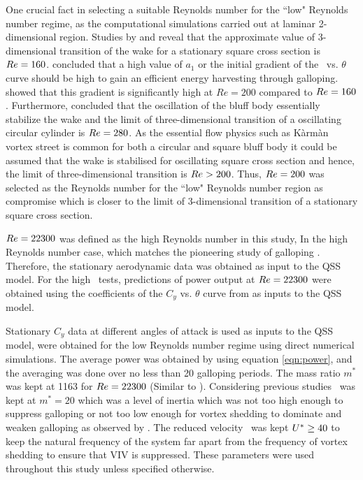 One crucial fact  in selecting a suitable Reynolds number for the ``low" Reynolds number regime, as the computational simulations carried out at laminar 2-dimensional region. Studies by \citet{tong2008} and \citet{sheard2009} reveal that the approximate value of 3-dimensional transition of the wake for a stationary square cross section is $Re=160$. \citet{Barrero-Gil2010a} concluded that a high value of $a_1$ or the initial gradient of the \cy\ vs. $\theta$ curve should be high to gain an efficient energy harvesting through galloping. \citet{Joly2012} showed that this gradient is significantly high at $Re=200$ compared to $Re=160$. Furthermore, \citet{Leontini2007a} concluded that the oscillation of the bluff body essentially stabilize the wake and the limit of three-dimensional transition of a oscillating circular cylinder is $Re=280$. As the essential flow physics such as K\`arm\`an vortex street is common for both a circular and square bluff body it could be assumed that the wake is stabilised for oscillating square cross section and hence, the limit of three-dimensional transition is $Re>200$. Thus, $Re=200$ was selected as the Reynolds number for the ``low" Reynolds number region as compromise which is closer to the limit of 3-dimensional transition of a stationary square cross section.       


 $Re=22300$ was defined as the high Reynolds number in this study, In the high Reynolds number case, which matches the pioneering study of galloping \citet{Parkinson1964}. Therefore, the stationary aerodynamic data was obtained as input to the QSS model. For the high \reynoldsnumber\ tests, predictions of power output at $Re=22300$ were obtained using the coefficients of the $C_y$  vs. $\theta$ curve from \citet{Parkinson1964} as inputs to the QSS model. 

Stationary $C_y$ data at different angles of attack is used as inputs to the QSS model, were obtained  for the low Reynolds number regime using direct numerical simulations. The average power was obtained by using equation \ref{eqn:power}, and the averaging was done over no less than 20 galloping periods. The mass ratio $m^*$ was kept at 1163 for $Re=22300$ (Similar to \citet{Parkinson1964}). Considering previous studies\citep{Robertson2003,Joly2012} \mstar\ was kept at $m^*=20$ which was a level of inertia which was not too high enough to suppress galloping or not too low enough for vortex shedding to dominate and weaken galloping as observed by \citet{Joly2012}. The reduced velocity \ustar\ was kept $U^{*}\geq 40$ to keep the natural frequency of the system far apart from the frequency of vortex shedding to ensure that VIV is suppressed. These parameters were used throughout this study unless specified otherwise.

